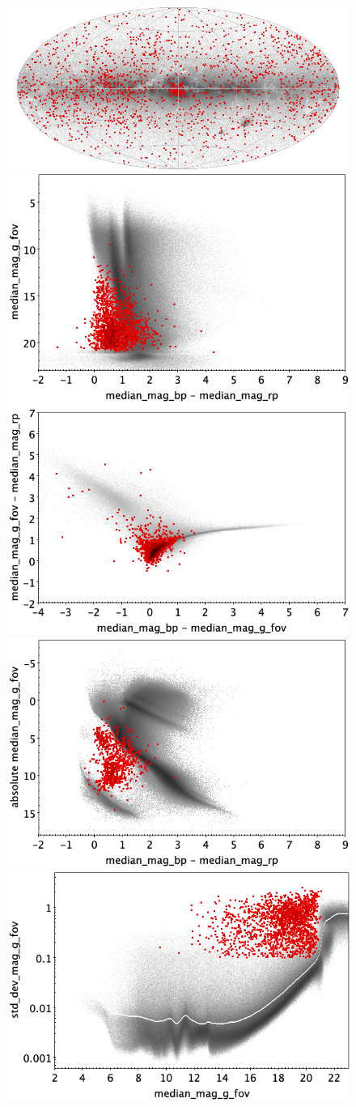 \documentclass[longauth]{aa}
\begin{document}
\begin{appendix}
\begin{figure}
\centering
{} \includegraphics[width=0.6\hsize]{figures/appendix/CV_trn_sky.png} \\ %
\vspace{4mm}
 \includegraphics[width=0.45\hsize]{figures/appendix/CV_trn_cm.png}  %
\hspace{2mm}
 \includegraphics[width=0.45\hsize]{figures/appendix/CV_trn_cc.png} \\ %
\vspace{4mm}
 \includegraphics[width=0.45\hsize]{figures/appendix/CV_trn_cam.png}  %
\hspace{2mm}
 \includegraphics[width=0.45\hsize]{figures/appendix/CV_trn_msd.png} \\ %

\end{figure}
\end{appendix}
\end{document}
